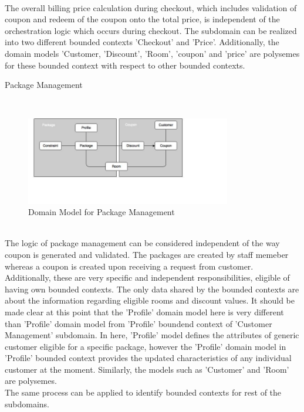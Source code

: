 \\
The overall billing price calculation during checkout, which includes validation of coupon and redeem of the coupon onto the total price, is independent of the orchestration logic which occurs during checkout. The subdomain can be realized into two different bounded contexts 'Checkout' and 'Price'. Additionally, the domain models 'Customer, 'Discount', 'Room', 'coupon' and 'price' are polysemes for these bounded context with respect to other bounded contexts.\\
\begin{shaded} Package Management \end{shaded}
\\
\begin{figure}[H]
\begin{center}
\includegraphics[width=0.8\textwidth]{figures/domain-driven-design-five}
\caption{Domain Model for Package Management}
\label{fig:domain_driven_design/example_scenario/subdomains/package-management}
\end{center}
\end{figure}
\\
The logic of package management can be considered independent of the way coupon is generated and validated. The packages are created by staff memeber whereas a coupon is created upon receiving a request from customer. Additionally, these are very specific and independent responsibilities, eligible of having own bounded contexts. The only data shared by the bounded contexts are about the information regarding eligible rooms and discount values. It should be made clear at this point that the 'Profile' domain model here is very different than 'Profile' domain model from 'Profile' boundend context of 'Customer Management' subdomain. In here, 'Profile' model defines the attributes of generic customer eligible for a specific package, however the 'Profile' domain model in 'Profile' bounded context provides the updated characteristics of any individual customer at the moment. Similarly, the models such as 'Customer' and 'Room' are polysemes.\\
The same process can be applied to identify bounded contexts for rest of the subdomains.